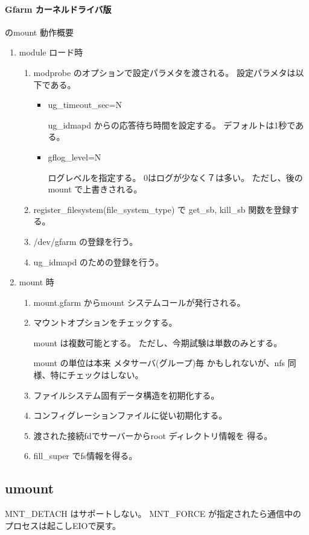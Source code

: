 \paragraph{Gfarm カーネルドライバ版} のmount 動作概要
	\begin{enumerate}
	\item	module ロード時	\par
		\begin{enumerate}
		\item	modprobe のオプションで設定パラメタを渡される。
			設定パラメタは以下である。
			\begin{itemize}
			\item ug_timeout_sec=N	\par
				ug_idmapd からの応答待ち時間を設定する。
				デフォルトは1秒である。
			\item gflog_level=N	\par
				ログレベルを指定する。
				0はログが少なく７は多い。
				ただし、後のmount で上書きされる。
			\end{itemize}
		\item	register_filesystem(file_system_type) で
			get_sb, kill_sb 関数を登録する。
		\item	/dev/gfarm の登録を行う。
		\item	ug_idmapd のための登録を行う。
		\end{enumerate}
	\item	mount 時
		\begin{enumerate}
		\item	mount.gfarm からmount システムコールが発行される。
		\item	マウントオプションをチェックする。	\par
		
			mount は複数可能とする。
			ただし、今期試験は単数のみとする。

			mount の単位は本来 メタサーバ(グループ)毎
			かもしれないが、nfs 同様、特にチェックはしない。
			
		\item	ファイルシステム固有データ構造を初期化する。
		\item	コンフィグレーションファイルに従い初期化する。
		\item	渡された接続fdでサーバーからroot ディレクトリ情報を
			得る。
		\item	fill_super でfs情報を得る。
		\end{enumerate}
	\end{enumerate}


\subsection{umount}
	MNT_DETACH はサポートしない。
	MNT_FORCE が指定されたら通信中のプロセスは起こしEIOで戻す。

